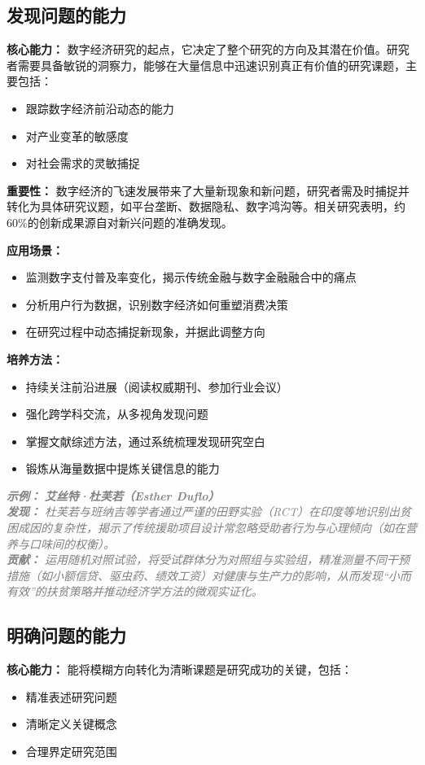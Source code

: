 \documentclass[lang=cn,12pt,a4paper]{elegantpaper}
\newcommand{\skillexample}[1]{\smallskip\noindent\textcolor{gray}{\textit{\footnotesize\textbf{示例：}} \textit{\footnotesize #1}}}
\begin{document}
\subsection{发现问题的能力}\label{sec:problem_identification}
\textbf{核心能力：} 数字经济研究的起点，它决定了整个研究的方向及其潜在价值。研究者需要具备敏锐的洞察力，能够在大量信息中迅速识别真正有价值的研究课题，主要包括：
\begin{itemize}
    \item 跟踪数字经济前沿动态的能力
    \item 对产业变革的敏感度
    \item 对社会需求的灵敏捕捉
\end{itemize}

\textbf{重要性：} 数字经济的飞速发展带来了大量新现象和新问题，研究者需及时捕捉并转化为具体研究议题，如平台垄断、数据隐私、数字鸿沟等。相关研究表明，约60\%的创新成果源自对新兴问题的准确发现。

\textbf{应用场景：} 
\begin{itemize}
    \item 监测数字支付普及率变化，揭示传统金融与数字金融融合中的痛点
    \item 分析用户行为数据，识别数字经济如何重塑消费决策
    \item 在研究过程中动态捕捉新现象，并据此调整方向
\end{itemize}

\textbf{培养方法：} 
\begin{itemize}
    \item 持续关注前沿进展（阅读权威期刊、参加行业会议）
    \item 强化跨学科交流，从多视角发现问题
    \item 掌握文献综述方法，通过系统梳理发现研究空白
    \item 锻炼从海量数据中提炼关键信息的能力
\end{itemize}

\skillexample{%
\textbf{艾丝特·杜芙若（Esther Duflo）}\\
\textbf{发现：} 杜芙若与班纳吉等学者通过严谨的田野实验（RCT）在印度等地识别出贫困成因的复杂性，揭示了传统援助项目设计常忽略受助者行为与心理倾向（如在营养与口味间的权衡）。\\
\textbf{贡献：} 运用随机对照试验，将受试群体分为对照组与实验组，精准测量不同干预措施（如小额信贷、驱虫药、绩效工资）对健康与生产力的影响，从而发现“小而有效”的扶贫策略并推动经济学方法的微观实证化。}

\subsection{明确问题的能力}\label{sec:clarify_problem}
\textbf{核心能力：} 能将模糊方向转化为清晰课题是研究成功的关键，包括：
\begin{itemize}
    \item 精准表述研究问题
    \item 清晰定义关键概念
    \item 合理界定研究范围
\end{itemize}
\end{document}
